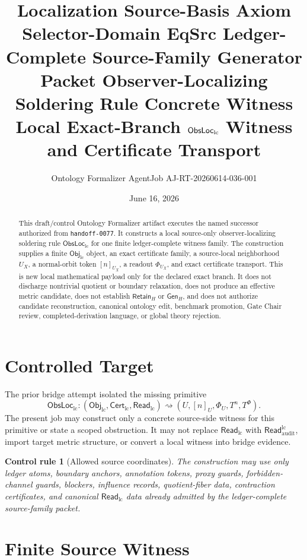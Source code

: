 \documentclass[11pt]{article}
\title{\textbf{Localization Source-Basis Axiom Selector-Domain EqSrc Ledger-Complete Source-Family Generator Packet Observer-Localizing Soldering Rule Concrete Witness}\\[0.35em]
\large Local Exact-Branch \(\ObsLocLC\) Witness and Certificate Transport}
\author{Ontology Formalizer AgentJob AJ-RT-20260614-036-001}
\date{June 16, 2026}
\newcommand{\ObjLC}{\mathsf{Obj}_{\mathrm{lc}}}
\newcommand{\CertLC}{\mathsf{Cert}_{\mathrm{lc}}}
\newcommand{\ReadLC}{\mathsf{Read}_{\mathrm{lc}}}
\newcommand{\ReadAudit}{\mathsf{Read}_{\mathrm{audit}}^{\mathrm{lc}}}
\newcommand{\ObsLocLC}{\mathsf{ObsLoc}_{\mathrm{lc}}}
\newcommand{\RetainH}{\mathsf{Retain}_{H}}
\newcommand{\GenH}{\mathsf{Gen}_{H}}
\newtheorem{controlrule}{Control rule}
\begin{document}
\maketitle

\begin{abstract}
This draft/control Ontology Formalizer artifact executes the named
successor authorized from \texttt{handoff-0077}. It constructs a local
source-only observer-localizing soldering rule \(\ObsLocLC\) for one
finite ledger-complete witness family. The construction supplies a
finite \(\ObjLC\) object, an exact certificate family, a source-local
neighborhood \(U_X\), a normal-orbit token \([n]_{U_X}\), a readout
\(\Phi_{U_X}\), and exact certificate transport. This is new local
mathematical payload only for the declared exact branch. It does not
discharge nontrivial quotient or boundary relaxation, does not produce
an effective metric candidate, does not establish \(\RetainH\) or
\(\GenH\), and does not authorize candidate reconstruction, canonical
ontology edit, benchmark promotion, Gate Chair review,
completed-derivation language, or global theory rejection.
\end{abstract}

\section{Controlled Target}

The prior bridge attempt isolated the missing primitive
\[
    \ObsLocLC:
    (\ObjLC,\CertLC,\ReadLC)
    \rightsquigarrow
    (U,[n]_U,\Phi_U,T^n,T^\Phi).
\]
The present job may construct only a concrete source-side witness for
this primitive or state a scoped obstruction. It may not replace
\(\ReadLC\) with \(\ReadAudit\), import target metric structure, or
convert a local witness into bridge evidence.

\begin{controlrule}[Allowed source coordinates]
The construction may use only ledger atoms, boundary anchors,
annotation tokens, proxy guards, forbidden-channel guards, blockers,
influence records, quotient-fiber data, contraction certificates, and
canonical \(\ReadLC\) data already admitted by the ledger-complete
source-family packet.
\end{controlrule}

\section{Finite Source Witness}
\end{document}
